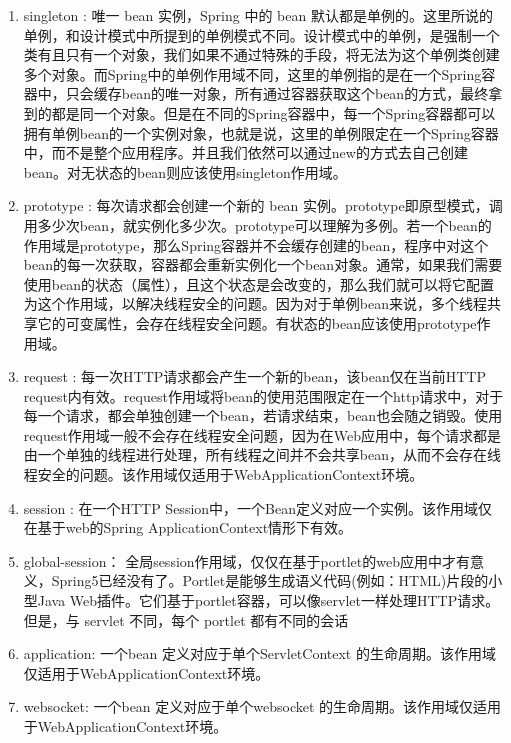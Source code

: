 \documentclass[../../../interview-questions.tex]{subfiles}
\begin{document}
\begin{enumerate}
    \item {singleton : 唯一 bean 实例，Spring 中的 bean 默认都是单例的。}这里所说的单例，和设计模式中所提到的单例模式不同。设计模式中的单例，是强制一个类有且只有一个对象，我们如果不通过特殊的手段，将无法为这个单例类创建多个对象。而Spring中的单例作用域不同，这里的单例指的是在一个Spring容器中，只会缓存bean的唯一对象，所有通过容器获取这个bean的方式，最终拿到的都是同一个对象。但是在不同的Spring容器中，每一个Spring容器都可以拥有单例bean的一个实例对象，也就是说，这里的单例限定在一个Spring容器中，而不是整个应用程序。并且我们依然可以通过new的方式去自己创建bean。对无状态的bean则应该使用singleton作用域。
    \item {prototype : 每次请求都会创建一个新的 bean 实例。}prototype即原型模式，调用多少次bean，就实例化多少次。prototype可以理解为多例。若一个bean的作用域是prototype，那么Spring容器并不会缓存创建的bean，程序中对这个bean的每一次获取，容器都会重新实例化一个bean对象。通常，如果我们需要使用bean的状态（属性），且这个状态是会改变的，那么我们就可以将它配置为这个作用域，以解决线程安全的问题。因为对于单例bean来说，多个线程共享它的可变属性，会存在线程安全问题。有状态的bean应该使用prototype作用域。
    \item {request : 每一次HTTP请求都会产生一个新的bean，该bean仅在当前HTTP request内有效。}request作用域将bean的使用范围限定在一个http请求中，对于每一个请求，都会单独创建一个bean，若请求结束，bean也会随之销毁。使用request作用域一般不会存在线程安全问题，因为在Web应用中，每个请求都是由一个单独的线程进行处理，所有线程之间并不会共享bean，从而不会存在线程安全的问题。该作用域仅适用于WebApplicationContext环境。
    \item {session : 在一个HTTP Session中，一个Bean定义对应一个实例。该作用域仅在基于web的Spring ApplicationContext情形下有效。}
    \item {global-session： 全局session作用域，仅仅在基于portlet的web应用中才有意义，Spring5已经没有了。Portlet是能够生成语义代码(例如：HTML)片段的小型Java Web插件。它们基于portlet容器，可以像servlet一样处理HTTP请求。但是，与 servlet 不同，每个 portlet 都有不同的会话}
    \item {application: 一个bean 定义对应于单个ServletContext 的生命周期。该作用域仅适用于WebApplicationContext环境。}
    \item {websocket: 一个bean 定义对应于单个websocket 的生命周期。该作用域仅适用于WebApplicationContext环境。}
\end{enumerate}
\end{document}
